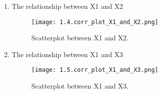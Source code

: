 \documentclass[12pt,letterpaper]{article}
\begin{document}
\begin{enumerate}
\begin{enumerate}
		\item The relationship between X1 and X2 \\
		\begin{figure}[h!]\centering
			\caption{\footnotesize Scatterplot between X1 and X2.}
			\label{fig:plot_1}
			\texttt{[image: 1.4.corr\_plot\_X1\_and\_X2.png]}
		\end{figure}
	
		\item The relationship between X1 and X3 \\
		\begin{figure}[h!]\centering
			\caption{\footnotesize Scatterplot between X1 and X3.}
			\label{fig:plot_1}
			\texttt{[image: 1.5.corr\_plot\_X1\_and\_X3.png]}
		\end{figure}

	\end{enumerate} 
\end{enumerate} 
\end{document}
